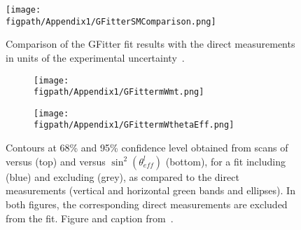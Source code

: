 \begin{figure}[!hbt]
    \centering
    \texttt{[image: \\figpath/Appendix1/GFitterSMComparison.png]}
    \caption{Comparison of the GFitter fit results with the direct measurements in units of the experimental uncertainty~\cite{Baak:2014ora}.}
    \label{fig:SMConsistency}
\end{figure}

\begin{figure}[!hbt]
    \centering
    \begin{subfigure}[t]{0.83\textwidth}
        \texttt{[image: \\figpath/Appendix1/GFittermWmt.png]}
        \caption{}
        \label{fig:mWmtGFitter}
    \end{subfigure}

    \begin{subfigure}[t]{0.83\textwidth}
        \texttt{[image: \\figpath/Appendix1/GFittermWthetaEff.png]}
        \caption{}
        \label{fig:mWthetaEffGFitter}
    \end{subfigure}
    \caption{Contours at 68\% and 95\% confidence level obtained from scans of \MW versus \Mt (top) and \MW versus $\sin^{2}\left(\theta_{eff}^{l}\right)$ (bottom), for a fit including \MH (blue) and excluding \MH (grey), as compared to the direct measurements (vertical and horizontal green bands and ellipses). In both figures, the corresponding direct measurements are excluded from the fit. Figure and caption from~\cite{Baak:2014ora}.}
    \label{fig:GFitterResults}
\end{figure}

